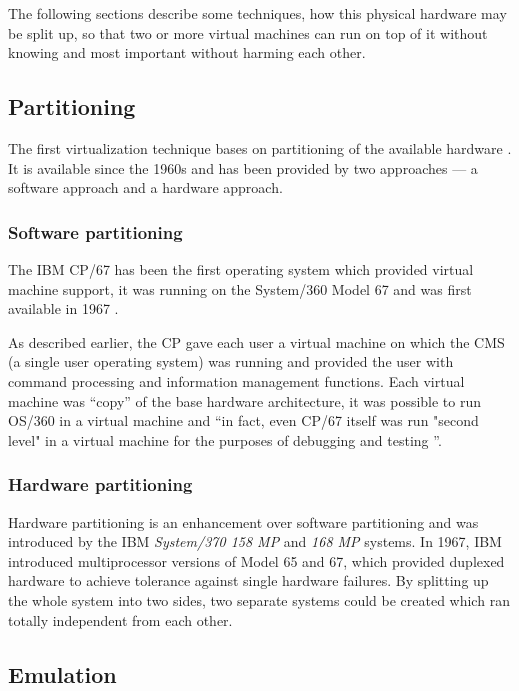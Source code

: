 The  following  sections  describe  some  techniques,  how  this  physical
hardware may be split up, so that  two or more virtual machines can run on
top of it without knowing and most important without harming each other.

\subsection{Partitioning}
\label{sec:vt-partitioning}

The first virtualization technique  bases on partitioning of the available
hardware \cite{borden89}.   It is available  since the 1960s and  has been
provided  by  two  approaches  ---  a software  approach  and  a  hardware
approach.

\subsubsection{Software partitioning}
\label{sec:softw-part}

The IBM CP/67  has been the first operating  system which provided virtual
machine support, it  was running on the System/360 Model  67 and was first
available in 1967 \cite{borden89}.

As described earlier, the CP gave each user a virtual machine on which the
CMS (a  single user  operating system) was  running and provided  the user
with command processing and information management functions. Each virtual
machine was ``copy'' of the base hardware architecture, it was possible to
run OS/360 in  a virtual machine and ``in fact, even  CP/67 itself was run
"second  level" in a  virtual machine  for the  purposes of  debugging and
testing \cite{borden89}''.

\subsubsection{Hardware partitioning}
\label{sec:hardw-part}

Hardware partitioning is an enhancement over software partitioning and was
introduced  by  the  IBM   \emph{System/370  158  MP}  and  \emph{168  MP}
systems. In 1967,  IBM introduced multiprocessor versions of  Model 65 and
67, which  provided duplexed hardware to achieve  tolerance against single
hardware failures.  By  splitting up the whole system  into two sides, two
separate systems could be created  which ran totally independent from each
other.

\subsection{Emulation}
\label{sec:emulation}

